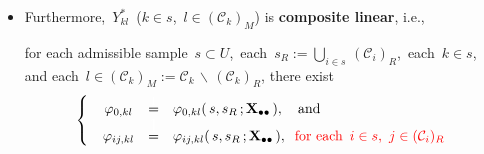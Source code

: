 \begin{itemize}
\begin{itemize}
        is a random matrix containing the values of the $\Re$predictor variables for $\Ydot$,
        where the $i^{\textnormal{th}}$ row of \,$\Xdotdot$\, corresponds to populaton unit \,$i \in U$,\,
        and where \,$\overline{R} \,:=\, \Re \sqcup \{\,\texttt{NA}\,\}$\,
        is an extension of $\Re$ alllowing for missing values in \,$\Xdotdot$,\, and
    \item
        for each \,$i \in s$\, and \,$j \in \mathcal{C}_{i}$,\,
        \,$Y^{\dagger}_{ij} \;=\; R_{ij}\,Y_{ij}+(1-R_{ij})\,Y^{*}_{ij}$,\,
        and
        \begin{equation*}
        Y^{*}_{ij}
        \;\; = \;\;
            Y^{*}_{ij}(\,\Sdot,\Rdot,\Ydot,\Xdotdot\,)\,,
        \quad
        \textnormal{for each \,$j \in (\mathcal{C}_{i})_{M} = \mathcal{C}_{i}\,\backslash\,(\mathcal{C}_{i})_{R}$},
        \end{equation*}
        is an imputed value for
        \,$Y_{ij}$\, and \,$Y^{*}_{ij}$\,
        may depend on
        \,$\Sdot,\Rdot,\Ydot,\Xdotdot$.\,
    \end{itemize}
\item
    Furthermore, \,$Y^{*}_{kl}$\, ($k \in s$,\, $l \in (\mathcal{C}_{k})_{M}$)
    is \textbf{composite linear}, i.e., %
    \begin{center}
    \begin{minipage}{6.3in}
    for each admissible sample \,$s \subset U$,\,
    each \,$s_{R} := \underset{i \in s}{\bigcup}\,(\mathcal{C}_{i})_{R}$,\,
    {\color{red}
        each
        \,$k \in s$,\,
        and each
        \,$l \in (\mathcal{C}_{k})_{M} := \mathcal{C}_{k} \,\backslash\, (\mathcal{C}_{k})_{R}${\color{black},}
    }
    \vskip 0.01cm
    \noindent
    there exist
    \begin{equation*}
    \left\{\;\;\begin{array}{ccl}
    \varphi_{0,kl}
    & \overset{{\color{white}\textnormal{\small$1$}}}{=} &
        \varphi_{0,kl}(\,s,s_{R}\,;\Xdotdot\,),
        \quad
        \textnormal{and}
    \\
    \varphi_{ij,kl}
    & \overset{{\color{white}\textnormal{\Large$1$}}}{=} &
        \varphi_{ij,kl}(\,s,s_{R}\,;\Xdotdot\,),
        \;\;
        \textnormal{{\color{red}for each \,$i \in s$,\, $j \in (\mathcal{C}_{i})_{R}$}}
    \end{array}\right.
    \end{equation*}

\end{minipage}
\end{center}
\end{itemize}
